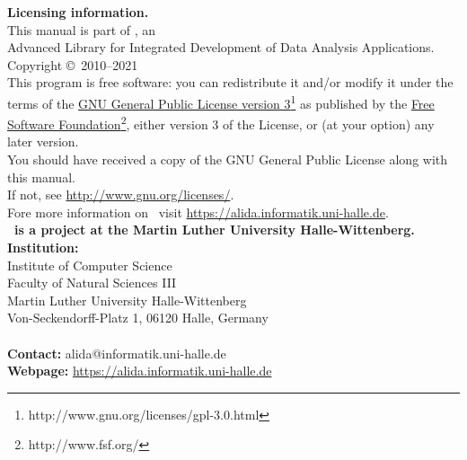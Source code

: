 \newpage
\thispagestyle{empty}
\parindent0pt
{\large \textbf{Licensing information.}}\\[0.5cm]
This manual is part of \alida, an\\
Advanced Library for Integrated Development of Data Analysis
Applications.\\[0.5cm] Copyright \copyright\ 2010--2021\\[0.5cm] 
This program is free software: you can redistribute it and/or modify
it under the terms of the
\href{http://www.gnu.org/licenses/gpl-3.0.html}
{GNU General Public License version	3}\footnote{http://www.gnu.org/licenses/gpl-3.0.html} as published by the \href{http://www.fsf.org/}{Free Software Foundation}\footnote{http://www.fsf.org/}, either version 3 of the License, or (at your option) any later version.\\
You should have received a copy of the GNU General Public License
along with this manual.\\
If not,
see \url{http://www.gnu.org/licenses/}.\\[1.0cm]
Fore more information on \alida\ visit
\href{https://alida.informatik.uni-halle.de}{
https://alida.informatik.uni-halle.de}.\\[5.0cm] 

{\large \textbf{\alida\ is a project at the Martin Luther University
Halle-Wittenberg.}}\\[0.5cm]

\textbf{Institution:}\\[0.5cm]
Institute of Computer Science\\
Faculty of Natural Sciences III\\
Martin Luther University Halle-Wittenberg\\
Von-Seckendorff-Platz 1, 06120 Halle, Germany\\\\
\textbf{Contact:} alida@informatik.uni-halle.de\\
\textbf{Webpage:} \url{https://alida.informatik.uni-halle.de}
\parindent20pt
\newpage
{}


\tableofcontents

\setcounter{page}{1}
\clearpage
{}

